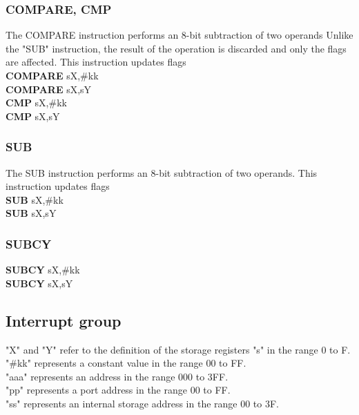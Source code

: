 {                        \subsubsection{COMPARE, CMP}
                        The COMPARE instruction performs an 8-bit subtraction of two operands Unlike the "SUB" instruction, the result of the operation is
                        discarded and only the flags are affected. This instruction updates flags\\
                            \textbf{COMPARE} sX,\#kk\\
                            \textbf{COMPARE} sX,sY\\
                            \textbf{CMP}     sX,\#kk\\
                            \textbf{CMP}     sX,sY\\

                        \subsubsection{SUB}
                        The SUB instruction performs an 8-bit subtraction of two operands. This instruction updates flags\\
                            \textbf{SUB} sX,\#kk\\
                            \textbf{SUB} sX,sY\\
                        \subsubsection{SUBCY}
                            \textbf{SUBCY} sX,\#kk\\
                            \textbf{SUBCY} sX,sY\\

                \subsection{Interrupt group}
                "X" and "Y" refer to the definition of the storage registers "s" in the range 0 to F.\\
                "\#kk" represents a constant value in the range 00 to FF.\\
                "aaa" represents an address in the range 000 to 3FF.\\
                "pp" represents a port address in the range 00 to FF.\\
                "ss" represents an internal storage address in the range 00 to 3F.\\
}
